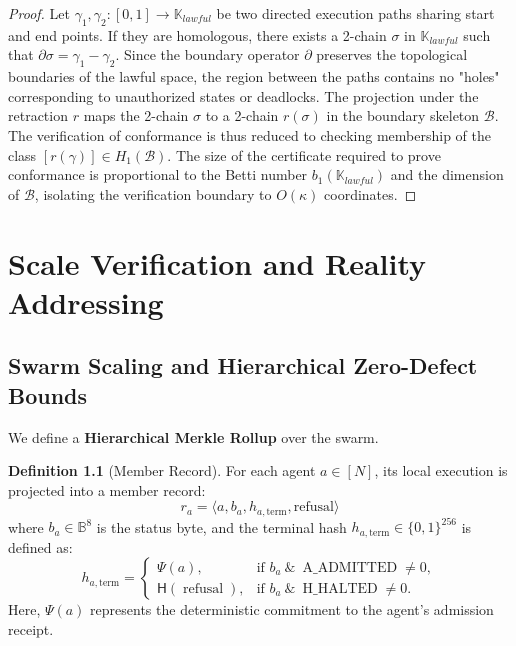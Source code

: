 \documentclass[11pt,oneside]{book}
\theoremstyle{definition}
\newtheorem{definition}{Definition}[chapter]
\theoremstyle{plain}
\theoremstyle{remark}
\newcommand{\chainH}{\mathsf{H}}               %
\newcommand{\CL}{\kappa}                       %
\newcommand{\abyte}[1]{{b_{#1}}}                 %
\begin{document}
\begin{proof}
Let $\gamma_1, \gamma_2: [0, 1] \to \mathbb{K}_{lawful}$ be two directed execution paths sharing start and end points. %
If they are homologous, there exists a 2-chain $\sigma$ in $\mathbb{K}_{lawful}$ such that $\partial \sigma = \gamma_1 - \gamma_2$. %
Since the boundary operator $\partial$ preserves the topological boundaries of the lawful space, the region between the paths contains no "holes" corresponding to unauthorized states or deadlocks. %
The projection under the retraction $r$ maps the 2-chain $\sigma$ to a 2-chain $r(\sigma)$ in the boundary skeleton $\mathcal{B}$. %
The verification of conformance is thus reduced to checking membership of the class $[r(\gamma)] \in H_1(\mathcal{B})$. %
The size of the certificate required to prove conformance is proportional to the Betti number $b_1(\mathbb{K}_{lawful})$ and the dimension of $\mathcal{B}$, isolating the verification boundary to $O(\CL)$ coordinates. %
\end{proof}

\chapter{Scale Verification and Reality Addressing}
\label{ch:verification}

\section{Swarm Scaling and Hierarchical Zero-Defect Bounds}
We define a \textbf{Hierarchical Merkle Rollup} over the swarm. %

\begin{definition}[Member Record]\label{def:member_rec}
For each agent $a \in [N]$, its local execution is projected into a member record:
\[
r_a = \langle a, \abyte{a}, h_{a,\mathrm{term}}, \text{refusal} \rangle
\]
where $\abyte{a} \in \mathbb{B}^8$ is the status byte, and the terminal hash $h_{a,\mathrm{term}} \in \{0, 1\}^{256}$ is defined as:
\[
h_{a,\mathrm{term}} = \begin{cases} \Psi(a), & \text{if } \abyte{a} \ \&\ \operatorname{A\_ADMITTED} \neq 0, \\ \chainH(\operatorname{refusal}), & \text{if } \abyte{a} \ \&\ \operatorname{H\_HALTED} \neq 0. \end{cases}
\]
Here, $\Psi(a)$ represents the deterministic commitment to the agent's admission receipt. %
\end{definition}
\end{document}
